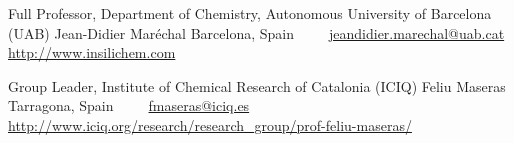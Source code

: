 


\begin{cventries}

    \cventry
        {Full Professor, Department of Chemistry, Autonomous University of Barcelona (UAB)}
        {Jean-Didier Maréchal}
        {Barcelona, Spain} %
        {~} %
        {~~ \footnotesize{%
            \href{mailto:jeandidier.marechal@uab.cat}{\faEnvelope\acvHeaderIconSep jeandidier.marechal@uab.cat}\acvHeaderSocialSep%
            \href{http://www.insilichem.com}{\faGlobe\acvHeaderIconSep http://www.insilichem.com}%
        }}

    \cventry
        {Group Leader, Institute of Chemical Research of Catalonia (ICIQ)}
        {Feliu Maseras}
        {Tarragona, Spain} %
        {~} %
        {~~ \footnotesize{%
            \href{mailto:fmaseras@iciq.es}{\faEnvelope\acvHeaderIconSep fmaseras@iciq.es}\acvHeaderSocialSep%
            \href{http://www.iciq.org/research/research_group/prof-feliu-maseras/}{\faGlobe\acvHeaderIconSep http://www.iciq.org/research/research\_group/prof-feliu-maseras/}
        }}

\end{cventries}
